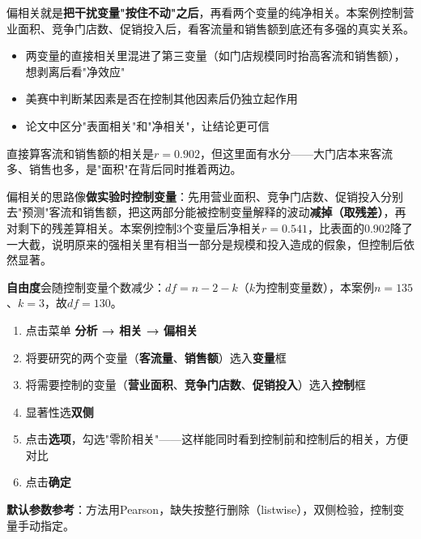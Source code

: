 \begin{algointro}
偏相关就是\textbf{把干扰变量"按住不动"之后}，再看两个变量的纯净相关。本案例控制营业面积、竞争门店数、促销投入后，看客流量和销售额到底还有多强的真实关系。
\end{algointro}

\begin{algoscene}
\begin{itemize}
    \item 两变量的直接相关里混进了第三变量（如门店规模同时抬高客流和销售额），想剥离后看"净效应"
    \item 美赛中判断某因素是否在控制其他因素后仍独立起作用
    \item 论文中区分"表面相关"和"净相关"，让结论更可信
\end{itemize}
\end{algoscene}

\begin{algoprinciple}
直接算客流和销售额的相关是$r=0.902$，但这里面有水分——大门店本来客流多、销售也多，是"面积"在背后同时推着两边。

偏相关的思路像\textbf{做实验时控制变量}：先用营业面积、竞争门店数、促销投入分别去"预测"客流和销售额，把这两部分能被控制变量解释的波动\textbf{减掉（取残差）}，再对剩下的残差算相关。本案例控制3个变量后净相关$r=0.541$，比表面的0.902降了一大截，说明原来的强相关里有相当一部分是规模和投入造成的假象，但控制后依然显著。

\textbf{自由度}会随控制变量个数减少：$df=n-2-k$（$k$为控制变量数），本案例$n=135$、$k=3$，故$df=130$。
\end{algoprinciple}

\begin{algosposs}
\begin{enumerate}
    \item 点击菜单 \textbf{分析 → 相关 → 偏相关}
    \item 将要研究的两个变量（\textbf{客流量}、\textbf{销售额}）选入\textbf{变量}框
    \item 将需要控制的变量（\textbf{营业面积}、\textbf{竞争门店数}、\textbf{促销投入}）选入\textbf{控制}框
    \item 显著性选\textbf{双侧}
    \item 点击\textbf{选项}，勾选"零阶相关"——这样能同时看到控制前和控制后的相关，方便对比
    \item 点击\textbf{确定}
\end{enumerate}

\textbf{默认参数参考}：方法用Pearson，缺失按整行删除（listwise），双侧检验，控制变量手动指定。
\end{algosposs}

